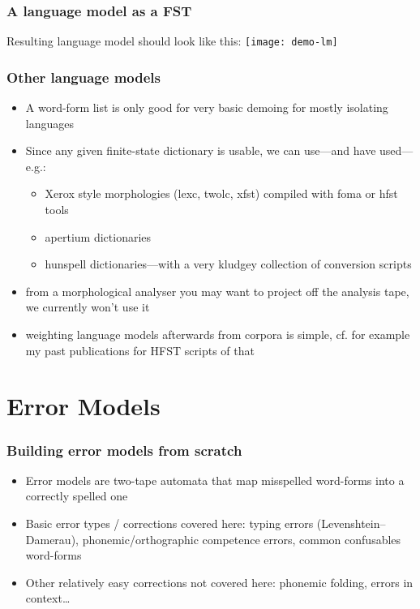 \documentclass[t,12pt]{beamer}
\begin{document}
\begin{frame}
    \frametitle{A language model as a FST}
    Resulting language model should look like this:
    \texttt{[image: demo-lm]}
\end{frame}

\begin{frame}
    \frametitle{Other language models}
    \begin{itemize}
        \item A word-form list is only good for very basic demoing for mostly
            isolating languages
        \item Since any given finite-state dictionary is usable, we can 
            use---and have used---e.g.:\begin{itemize}
                \item Xerox style morphologies (lexc, twolc, xfst)
                    compiled with foma or hfst tools
                \item apertium dictionaries
                \item hunspell dictionaries---with a very kludgey collection
                    of conversion scripts
            \end{itemize}
        \item from a morphological analyser you may want to project off the
            analysis tape, we currently won't use it
        \item weighting language models afterwards from corpora is simple, cf.
            for example my past publications for HFST scripts of that
    \end{itemize}
\end{frame}

\section{Error Models}

\begin{frame}
   \frametitle{Building error models from scratch}
   \begin{itemize}
       \item Error models are two-tape automata that map misspelled word-forms
           into a correctly spelled one
       \item Basic error types / corrections covered here: typing errors 
           (Levenshtein--Damerau), phonemic/orthographic competence errors,
           common confusables word-forms
       \item Other relatively easy corrections not covered here: phonemic
           folding, errors in context\ldots
   \end{itemize}
\end{frame}
\end{document}
